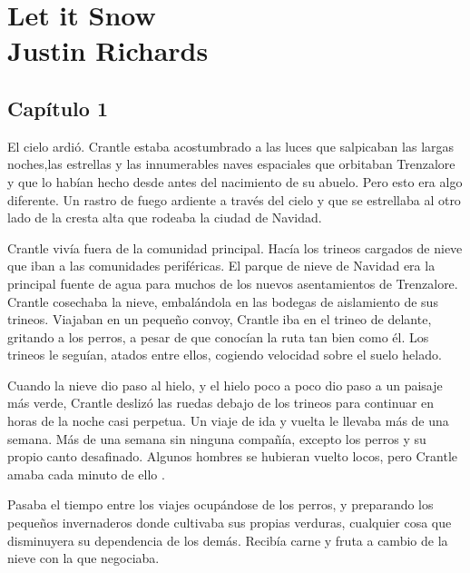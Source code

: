 \part*{Let it Snow \\ \vspace{2 mm} {\large Justin Richards}}

\chapter*{Capítulo 1}

El cielo ardió. Crantle estaba acostumbrado a las luces que salpicaban las largas noches,las estrellas y las innumerables naves espaciales que orbitaban Trenzalore y que lo habían hecho desde antes del nacimiento de su abuelo. Pero esto era algo diferente. Un rastro de fuego ardiente a través del cielo y que se estrellaba al otro lado de la cresta alta que rodeaba la ciudad de Navidad.



Crantle vivía fuera de la comunidad principal. Hacía los trineos cargados de nieve que iban a las comunidades periféricas. El parque de nieve de Navidad era la principal fuente de agua para muchos de los nuevos asentamientos de Trenzalore. Crantle cosechaba la nieve, embalándola en las bodegas de aislamiento de sus trineos. Viajaban en un pequeño convoy, Crantle iba en el trineo de delante, gritando a los perros, a pesar de que conocían la ruta tan bien como él. Los trineos le seguían, atados entre ellos, cogiendo velocidad sobre el suelo helado.



Cuando la nieve dio paso al hielo, y el hielo poco a poco dio paso a un paisaje más verde, Crantle deslizó las ruedas debajo de los trineos para continuar en horas de la noche casi perpetua. Un viaje de ida y vuelta le llevaba más de una semana. Más de una semana sin ninguna compañía, excepto los perros y su propio canto desafinado. Algunos hombres se hubieran vuelto locos, pero Crantle amaba cada minuto de ello .



Pasaba el tiempo entre los viajes ocupándose de los perros, y preparando los pequeños invernaderos donde cultivaba sus propias verduras, cualquier cosa que disminuyera su dependencia de los demás. Recibía carne y fruta a cambio de la nieve con la que negociaba.



